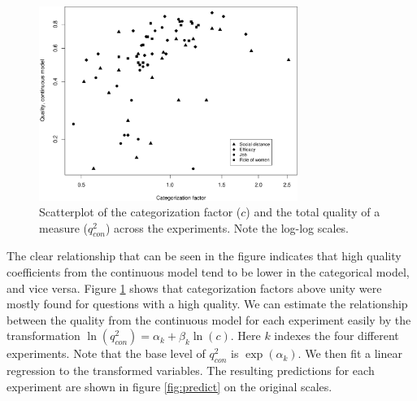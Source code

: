 \documentclass[a4paper,12pt]{article}
\begin{document}
\begin{figure}[bth] \centering
  \includegraphics[width=0.75\textwidth]{i/figure-5.pdf} \caption{Scatterplot
    of the categorization factor ($c$) and the total quality of a
    measure ($q_{con}^2$) across the experiments. Note the log-log
    scales.\label{fig:meta_scatter}} \end{figure}

The clear relationship that can be seen in the figure indicates that high quality coefficients from the continuous model tend to be lower in the categorical model, and vice versa. Figure \ref{fig:meta_scatter} shows that categorization factors above unity were mostly found for questions with a high quality. We can estimate the relationship between the quality from the continuous model for each experiment easily by the transformation $\ln(q^2_{con}) = \alpha_k + \beta_k \ln(c)$. Here $k$ indexes the four different experiments. Note that the base level of $q^2_{con}$ is $\exp(\alpha_k)$.%
We then fit a linear regression to the transformed variables. The resulting predictions for each experiment are shown in figure \ref{fig:predict} on the original scales.
\end{document}
